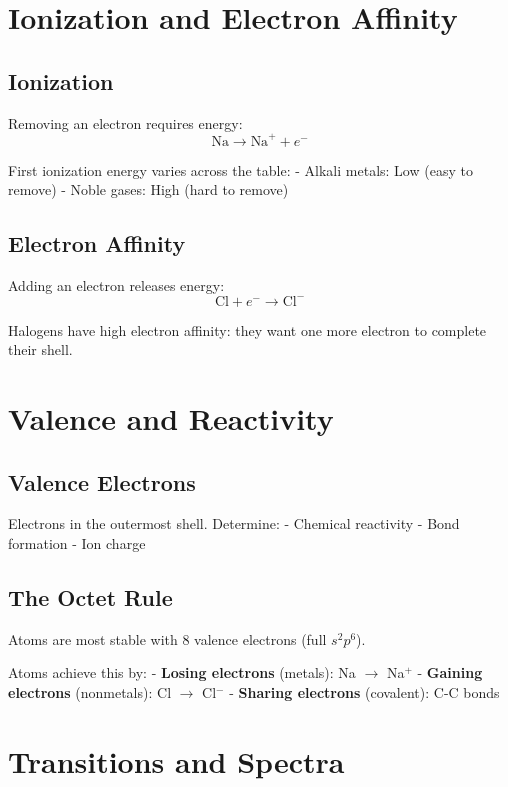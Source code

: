 \documentclass[
  11pt,
  letterpaper,
  twoside,
  openright]{book}
\begin{document}
\section{Ionization and Electron
Affinity}\label{ionization-and-electron-affinity}

\subsection{Ionization}\label{ionization}

Removing an electron requires energy: \[
\text{Na} \rightarrow \text{Na}^+ + e^-
\]

First ionization energy varies across the table: - Alkali metals: Low
(easy to remove) - Noble gases: High (hard to remove)

\subsection{Electron Affinity}\label{electron-affinity}

Adding an electron releases energy: \[
\text{Cl} + e^- \rightarrow \text{Cl}^-
\]

Halogens have high electron affinity: they want one more electron to
complete their shell.

\section{Valence and Reactivity}\label{valence-and-reactivity}

\subsection{Valence Electrons}\label{valence-electrons}

Electrons in the outermost shell. Determine: - Chemical reactivity -
Bond formation - Ion charge

\subsection{The Octet Rule}\label{the-octet-rule}

Atoms are most stable with 8 valence electrons (full \(s^2 p^6\)).

Atoms achieve this by: - \textbf{Losing electrons} (metals): Na \(\to\)
Na\(^+\) - \textbf{Gaining electrons} (nonmetals): Cl \(\to\) Cl\(^-\) -
\textbf{Sharing electrons} (covalent): C-C bonds

\section{Transitions and Spectra}\label{transitions-and-spectra}
\end{document}
